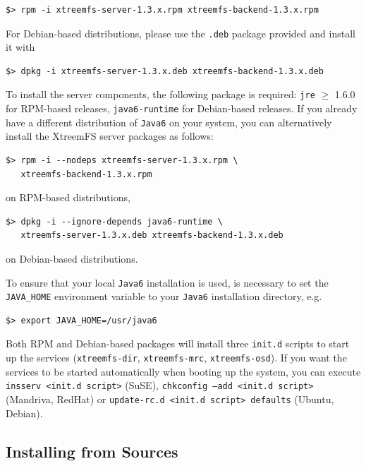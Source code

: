 \documentclass[a4paper,10pt]{book}
\begin{document}
\begin{verbatim}
$> rpm -i xtreemfs-server-1.3.x.rpm xtreemfs-backend-1.3.x.rpm
\end{verbatim}


For Debian-based distributions, please use the \texttt{.deb} package provided and install it with

\begin{verbatim}
$> dpkg -i xtreemfs-server-1.3.x.deb xtreemfs-backend-1.3.x.deb
\end{verbatim}


To install the server components, the following package is required: \texttt{jre} $\geq$ 1.6.0 for RPM-based releases, \texttt{java6-runtime} for Debian-based releases. If you already have a different distribution of \texttt{Java6} on your system, you can alternatively install the XtreemFS server packages as follows:

\begin{verbatim}
$> rpm -i --nodeps xtreemfs-server-1.3.x.rpm \
   xtreemfs-backend-1.3.x.rpm
\end{verbatim}

on RPM-based distributions,

\begin{verbatim}
$> dpkg -i --ignore-depends java6-runtime \
   xtreemfs-server-1.3.x.deb xtreemfs-backend-1.3.x.deb
\end{verbatim}

on Debian-based distributions.

To ensure that your local \texttt{Java6} installation is used, is necessary to set the \texttt{JAVA\_HOME} environment variable to your \texttt{Java6} installation directory, e.g.\

\begin{verbatim}
$> export JAVA_HOME=/usr/java6
\end{verbatim}


Both RPM and Debian-based packages will install three \texttt{init.d} scripts to start up the services (\texttt{xtreemfs-dir}, \texttt{xtreemfs-mrc}, \texttt{xtreemfs-osd}). If you want the services to be started automatically when booting up the system, you can execute \texttt{insserv <init.d script>} (SuSE), \texttt{chkconfig --add <init.d script>} (Mandriva, RedHat) or \texttt{update-rc.d <init.d script> defaults} (Ubuntu, Debian).

\subsection{Installing from Sources}
\end{document}
